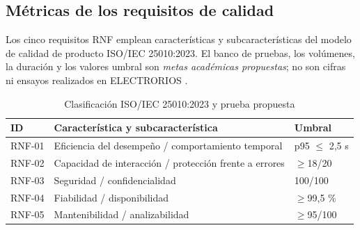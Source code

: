 \subsection{Métricas de los requisitos de calidad}
Los cinco requisitos RNF emplean características y subcaracterísticas del modelo de calidad de producto ISO/IEC 25010:2023. El banco de pruebas, los volúmenes, la duración y los valores umbral son \emph{metas académicas propuestas}; no son cifras ni ensayos realizados en ELECTRORIOS \cite{iso25010}.
\begin{table}[!ht]
\centering\scriptsize
\caption{Clasificación ISO/IEC 25010:2023 y prueba propuesta}
\label{tab:calidad16}
\begin{tabularx}{\columnwidth}{@{}P{1.25cm}Y P{1.15cm}@{}}
\toprule ID & Característica y subcaracterística & Umbral\\\midrule
RNF-01 & Eficiencia del desempeño / comportamiento temporal & p95 $\leq$ 2,5 s\\
RNF-02 & Capacidad de interacción / protección frente a errores & $\geq$18/20\\
RNF-03 & Seguridad / confidencialidad & 100/100\\
RNF-04 & Fiabilidad / disponibilidad & $\geq$99,5 \%\\
RNF-05 & Mantenibilidad / analizabilidad & $\geq$95/100\\
\bottomrule
\end{tabularx}
\end{table}

